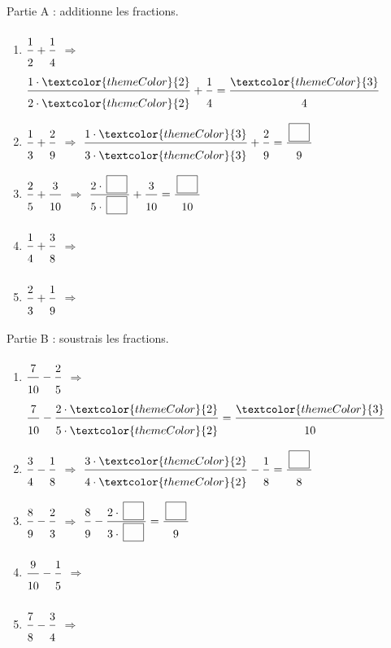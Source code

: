 \medskip
\textcolor{themeColor}{Partie A} : additionne les fractions.

\begin{enumerate}[leftmargin=*,align=parleft, label=\alph*), itemsep=9pt]
\item $\FA{1}{2}+\FA{1}{4}$ \quad $\Longrightarrow$ \quad $\FA{1 \cdot \textcolor{themeColor}{2}}{2 \cdot \textcolor{themeColor}{2}}+\FA{1}{4}=\FA{\textcolor{themeColor}{3}}{4}$
\item $\FA{1}{3}+\FA{2}{9}$ \quad $\Longrightarrow$ \quad $\FA{1 \cdot \textcolor{themeColor}{3}}{3 \cdot \textcolor{themeColor}{3}}+\FA{2}{9}=\FA{\CaseC}{9}$
\item $\FA{2}{5}+\FA{3}{10}$ \quad $\Longrightarrow$ \quad $\FA{2 \cdot \CaseC}{5 \cdot \CaseC}+\FA{3}{10}=\FA{\CaseC}{10}$
\item $\FA{1}{4}+\FA{3}{8}$ \quad $\Longrightarrow$
\item $\FA{2}{3}+\FA{1}{9}$ \quad $\Longrightarrow$
\end{enumerate}

\medskip
\textcolor{themeColor}{Partie B} : soustrais les fractions.

\begin{enumerate}[leftmargin=*,align=parleft, label=\alph*), itemsep=9pt, start=6]
\item $\FA{7}{10}-\FA{2}{5}$ \quad $\Longrightarrow$ \quad $\FA{7}{10}-\FA{2 \cdot \textcolor{themeColor}{2}}{5 \cdot \textcolor{themeColor}{2}}=\FA{\textcolor{themeColor}{3}}{10}$
\item $\FA{3}{4}-\FA{1}{8}$ \quad $\Longrightarrow$ \quad $\FA{3 \cdot \textcolor{themeColor}{2}}{4 \cdot \textcolor{themeColor}{2}}-\FA{1}{8}=\FA{\CaseC}{8}$
\item $\FA{8}{9}-\FA{2}{3}$ \quad $\Longrightarrow$ \quad $\FA{8}{9}-\FA{2 \cdot \CaseC}{3 \cdot \CaseC}=\FA{\CaseC}{9}$
\item $\FA{9}{10}-\FA{1}{5}$ \quad $\Longrightarrow$
\item $\FA{7}{8}-\FA{3}{4}$ \quad $\Longrightarrow$
\end{enumerate}

\newpage
{}

